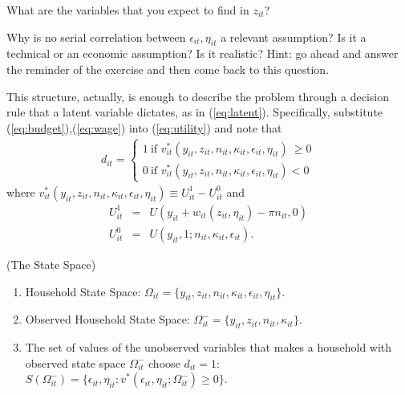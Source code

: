 \begin{exercise}
What are the variables that you expect to find in $z_{it}$?
\end{exercise}

\begin{exercise}
Why is no serial correlation between $\epsilon_{it}, \eta_{it}$ a relevant assumption? Is it a technical or an economic assumption? Is it realistic? Hint: go ahead and answer the reminder of the exercise and then come back to this question.
\end{exercise}

\indent This structure, actually, is enough to describe the problem through a decision rule that a latent variable dictates, as in (\ref{eq:latent}). Specifically, substitute (\ref{eq:budget}),(\ref{eq:wage}) into (\ref{eq:utility}) and note that
\begin{eqnarray}
d_{it} =
\begin{cases}
1 \  \text{if }  v_{it}^* \left( y_{it}, z_{it}, n_{it}, \kappa_{it}, \epsilon_{it}, \eta_{it} \right) \ \geq 0  \\
0 \  \text{if }  v_{it}^* \left( y_{it}, z_{it}, n_{it}, \kappa_{it}, \epsilon_{it}, \eta_{it} \right)  < 0 \label{eq:latent2}
\end{cases}
\end{eqnarray}
where $v_{it}^* \left( y_{it}, z_{it}, n_{it}, \kappa_{it}, \epsilon_{it}, \eta_{it} \right) \equiv U_{it}^1 - U_{it}^0$ and
\begin{eqnarray}
U_{it}^1 &=& U(y_{it} + w_{it}(z_{it}, \eta_{it}) - \pi n_{it}, 0) \\
U_{it}^0 &=& U(y_{it}, 1; n_{it}, \kappa_{it}, \epsilon_{it}).
\end{eqnarray}

\begin{definition} (The State Space)
\begin{enumerate}
\item Household State Space: $\Omega_{it} = \{ y_{it}, z_{it}, n_{it}, \kappa_{it}, \epsilon_{it}, \eta_{it} \}$.
\item Observed Household State Space: $\Omega_{it}^- = \{ y_{it}, z_{it}, n_{it}, \kappa_{it} \}$.
\item The set of values of the unobserved variables that makes a household with observed state space $\Omega_{it}^-$ choose $d_{it} = 1$: $S \left(  \Omega_{it}^- \right) = \{ \epsilon_{it}, \eta_{it}:  v^* \left(\epsilon_{it}, \eta_{it} ; \Omega_{it}^- \right) \geq 0 \}$. 
\end{enumerate}
\end{definition}


